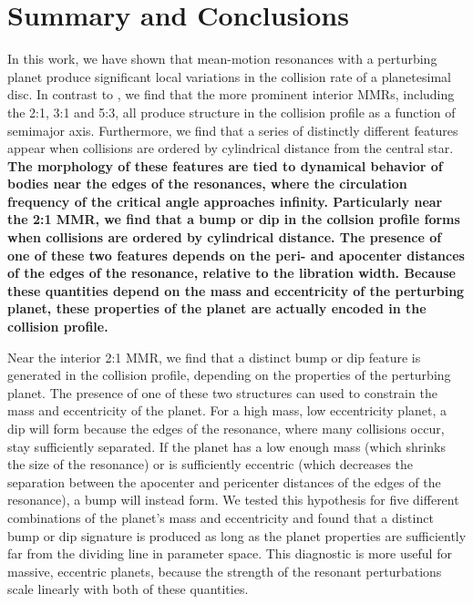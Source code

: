 \documentclass[fleqn,usenatbib]{mnras}
\begin{document}
\section{Summary and Conclusions}\label{sec:conclusions}

In this work, we have shown that mean-motion resonances with a perturbing planet produce significant local variations in the collision rate of a 
planetesimal disc. In contrast to \citet{2000Icar..143...45R}, we find that the more prominent interior MMRs, including the 2:1, 3:1 and 5:3, all 
produce structure in the collision profile as a function of semimajor axis. Furthermore, we find that a series of distinctly different features appear 
when collisions are ordered by cylindrical distance from the central star. \textbf{The morphology of these features are tied to dynamical behavior of bodies near the edges of the resonances, where the circulation frequency of the critical angle approaches infinity. Particularly near the 2:1 MMR, we find that a bump or dip in the collsion profile forms when collisions are ordered by cylindrical distance. The presence of one of these two features depends on the peri- and apocenter distances of the edges of the resonance, relative to the libration width. Because these quantities depend on the mass and eccentricity of the perturbing planet, these properties of the planet are actually encoded in the collision profile.}

Near the interior 2:1 MMR, we find that a distinct bump or dip feature is generated in the collision profile, depending on the properties of the perturbing 
planet. The presence of one of these two structures can used to constrain the mass and eccentricity of the planet. For a high mass, low eccentricity 
planet, a dip will form because the edges of the resonance, where many collisions occur, stay sufficiently separated. If the planet 
has a low enough mass (which shrinks the size of the resonance) or is sufficiently eccentric (which decreases the separation between the apocenter 
and pericenter distances of the edges of the resonance), a bump will instead form. We tested this hypothesis for five different combinations of the 
planet's mass and eccentricity and found that a distinct bump or dip signature is produced as long as the planet properties are sufficiently far from 
the dividing line in parameter space. This diagnostic is more useful for massive, eccentric planets, because the strength of the resonant 
perturbations scale linearly with both of these quantities.
\end{document}
